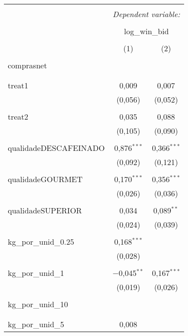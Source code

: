 
\begin{table}[!htbp] \centering 
  \caption{} 
  \label{} 
\begin{tabular}{@{\extracolsep{5pt}}lcc} 
\\[-1.8ex]\hline 
\hline \\[-1.8ex] 
 & \multicolumn{2}{c}{\textit{Dependent variable:}} \\ 
\cline{2-3} 
\\[-1.8ex] & \multicolumn{2}{c}{log\_win\_bid} \\ 
\\[-1.8ex] & (1) & (2)\\ 
\hline \\[-1.8ex] 
 comprasnet &  &  \\ 
  &  &  \\ 
  & & \\ 
 treat1 & 0,009 & 0,007 \\ 
  & (0,056) & (0,052) \\ 
  & & \\ 
 treat2 & 0,035 & 0,088 \\ 
  & (0,105) & (0,090) \\ 
  & & \\ 
 qualidadeDESCAFEINADO & 0,876$^{***}$ & 0,366$^{***}$ \\ 
  & (0,092) & (0,121) \\ 
  & & \\ 
 qualidadeGOURMET & 0,170$^{***}$ & 0,356$^{***}$ \\ 
  & (0,026) & (0,036) \\ 
  & & \\ 
 qualidadeSUPERIOR & 0,034 & 0,089$^{**}$ \\ 
  & (0,024) & (0,039) \\ 
  & & \\ 
 kg\_por\_unid\_0.25 & 0,168$^{***}$ &  \\ 
  & (0,028) &  \\ 
  & & \\ 
 kg\_por\_unid\_1 & $-$0,045$^{**}$ & 0,167$^{***}$ \\ 
  & (0,019) & (0,026) \\ 
  & & \\ 
 kg\_por\_unid\_10 &  &  \\ 
  &  &  \\ 
  & & \\ 
 kg\_por\_unid\_5 & 0,008 &  \\ 

\end{tabular}
\end{table}
